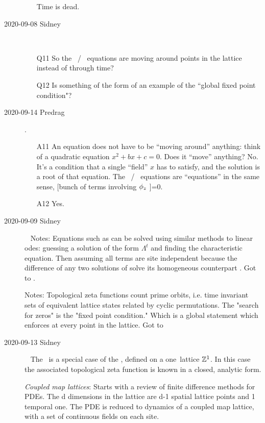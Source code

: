 \begin{description}
\begin{itemize}
Time is dead.
\end{itemize}

\item[2020-09-08 Sidney]~~
\begin{itemize}
	\item[Q11]
So the \templatt\ / \catlatt\ equations are moving around points in the lattice instead of
through time?
	\item[Q12]
Is something of the form of  an example
of the ``global fixed point condition"?
\end{itemize}

\item[2020-09-14 Predrag].
\begin{itemize}
	\item[A11]
An equation does not have to be ``moving around'' anything: think of a
quadratic equation $x^2+bx+c=0$. Does it ``move'' anything? No. It's a condition
that a single ``field'' $x$ has to satisfy, and the solution is a root of that
equation.
The \templatt\ / \catlatt\ equations are ``equations'' in the same sense,
[bunch of terms involving $\phi_z$ ]=0.
	\item[A12]
Yes.
\end{itemize}

\item[2020-09-09 Sidney]~
Notes: Equations such as  can be solved using similar methods to linear odes: guessing a solution of the form $\Lambda^t$ and finding the characteristic equation. Then assuming all terms are site independent because the difference of any two solutions of  solve its homogeneous counterpart . Got to .

Notes: Topological zeta functions count prime orbits, i.e. time invariant sets of equivalent lattice states related by cyclic permutations. The "search for zeros"  is the "fixed point condition." Which is a global statement which enforces  at every point in the lattice. Got to 

\item[2020-09-13 Sidney]~
The \templatt\ is a special case of the \catlatt, defined on a one\dmn\
lattice $\mathbb{Z}^1$. In this case the associated topological zeta
function is known in a closed, analytic form.

\emph{Coupled map lattices}: Starts with a review of finite difference
methods for PDEs. The d dimensions in the lattice are d-1 spatial lattice
points and 1 temporal one. The PDE is reduced to dynamics of a coupled
map lattice, with a set of continuous fields on each site.


\end{description}
